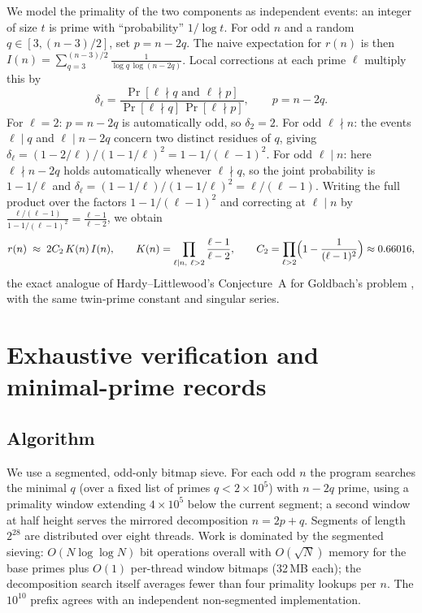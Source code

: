 \documentclass[11pt]{article}
\begin{document}
We model the primality of the two components as independent events: an
integer of size $t$ is prime with ``probability'' $1/\log t$. For odd
$n$ and a random $q \in [3, (n-3)/2]$, set $p = n - 2q$. The naive
expectation for $r(n)$ is then
$I(n) = \sum_{q=3}^{(n-3)/2} \frac{1}{\log q\,\log(n-2q)}$.
Local corrections at each prime $\ell$ multiply this by
\[
\delta_\ell =
\frac{\Pr[\ell \nmid q \text{ and } \ell \nmid p]}{\Pr[\ell\nmid q]\,\Pr[\ell\nmid p]},
\qquad p = n-2q.
\]
For $\ell = 2$: $p = n-2q$ is automatically odd, so $\delta_2 = 2$.
For odd $\ell \nmid n$: the events $\ell \mid q$ and $\ell \mid n-2q$
concern two distinct residues of $q$, giving
$\delta_\ell = (1-2/\ell)/(1-1/\ell)^2 = 1 - 1/(\ell-1)^2$.
For odd $\ell \mid n$: here $\ell \nmid n-2q$ holds automatically
whenever $\ell \nmid q$, so the joint probability is $1-1/\ell$ and
$\delta_\ell = (1-1/\ell)/(1-1/\ell)^2 = \ell/(\ell-1)$.
Writing the full product over the factors $1-1/(\ell-1)^2$ and
correcting at $\ell \mid n$ by
$\frac{\ell/(\ell-1)}{1-1/(\ell-1)^2} = \frac{\ell-1}{\ell-2}$, we obtain
\[
r(n) \;\approx\; 2C_2\,K(n)\,I(n),
\qquad
K(n) = \prod_{\ell\mid n,\ \ell>2}\frac{\ell-1}{\ell-2},
\qquad
C_2 = \prod_{\ell>2}\Bigl(1-\frac{1}{(\ell-1)^2}\Bigr) \approx 0.66016,
\]
the exact analogue of Hardy--Littlewood's Conjecture~A for Goldbach's
problem \cite{hl}, with the same twin-prime constant and singular series.

\section{Exhaustive verification and minimal-prime records}\label{sec:verify}

\subsection{Algorithm}
We use a segmented, odd-only bitmap sieve. For each odd $n$ the program
searches the minimal $q$ (over a fixed list of primes $q < 2\times10^5$)
with $n-2q$ prime, using a primality window extending $4\times10^5$
below the current segment; a second window at half height serves the
mirrored decomposition $n = 2p+q$. Segments of length $2^{28}$ are
distributed over eight threads. Work is dominated by the segmented
sieving:
$O(N\log\log N)$ bit operations overall with $O(\sqrt N)$ memory for the
base primes plus $O(1)$ per-thread window bitmaps (32\,MB each); the
decomposition search itself averages fewer than four primality lookups
per $n$. The $10^{10}$ prefix agrees with an independent non-segmented
implementation.
\end{document}
